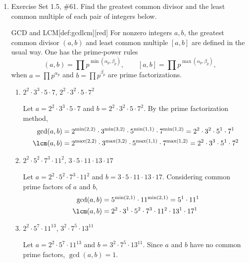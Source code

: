\begin{enumerate}
\item Exercise Set 1.5, \#61.
Find the greatest common divisor and the least common multiple of each pair of integers below.
\begin{define}{GCD and LCM}[def:gcdlcm][red]
  For nonzero integers $a,b$, the greatest common divisor $(a,b)$ and least common 
  multiple $[a,b]$ are defined in the usual way. One has the prime-power rules
  \[
  (a,b)=\prod p^{\min(\alpha_p,\beta_p)},\qquad [a,b]=\prod p^{\max(\alpha_p,\beta_p)},
  \]
  when $a=\prod p^{\alpha_p}$ and $b=\prod p^{\beta_p}$ are prime factorizations.
\end{define}
\begin{enumerate}
  \item $2^2 \cdot 3^3 \cdot 5 \cdot 7$, \quad $2^2 \cdot 3^2 \cdot 5 \cdot 7^2$
  \begin{subanswer}
    Let $a = 2^2 \cdot 3^3 \cdot 5 \cdot 7$ and $b = 2^2 \cdot 3^2 \cdot 5 \cdot 7^2$.
    By the prime factorization method,
    \begin{align*}
    \gcd(a,b) &= 2^{\min(2,2)} \cdot 3^{\min(3,2)} \cdot 5^{\min(1,1)} \cdot 7^{\min(1,2)} = 2^2 \cdot 3^2 \cdot 5^1 \cdot 7^1 \\
    \lcm(a,b) &= 2^{\max(2,2)} \cdot 3^{\max(3,2)} \cdot 5^{\max(1,1)} \cdot 7^{\max(1,2)} = 2^2 \cdot 3^3 \cdot 5^1 \cdot 7^2
    \end{align*}
  \end{subanswer}
  \item $2^2 \cdot 5^2 \cdot 7^3 \cdot 11^2$, \quad $3 \cdot 5 \cdot 11 \cdot 13 \cdot 17$
  \begin{subanswer}
    Let $a = 2^2 \cdot 5^2 \cdot 7^3 \cdot 11^2$ and $b = 3 \cdot 5 \cdot 11 \cdot 13 \cdot 17$. Considering common prime factors of $a$ and $b$,
    \begin{align*}
    \gcd(a,b) &= 5^{\min(2,1)} \cdot 11^{\min(2,1)} = 5^1 \cdot 11^1 \\
    \lcm(a,b) &= 2^2 \cdot 3^1 \cdot 5^2 \cdot 7^3 \cdot 11^2 \cdot 13^1 \cdot 17^1
    \end{align*}
  \end{subanswer}
  \item $2^2 \cdot 5^7 \cdot 11^{13}$, \quad $3^2 \cdot 7^5 \cdot 13^{11}$
  \begin{subanswer}
    Let $a = 2^2 \cdot 5^7 \cdot 11^{13}$ and $b = 3^2 \cdot 7^5 \cdot 13^{11}$.
    Since $a$ and $b$ have no common prime factors, $\gcd(a,b) = 1$.
    \begin{align*}

\end{align*}
\end{subanswer}
\end{enumerate}
\end{enumerate}
